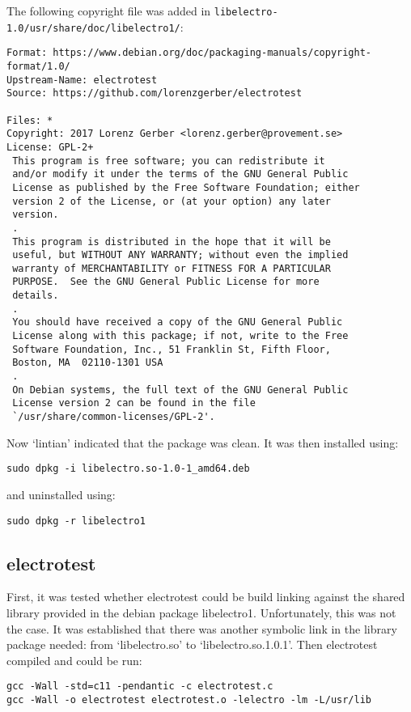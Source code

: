 \documentclass[a4paper,11pt,twoside]{article}
\begin{document}
The following copyright file was added in
\verb+libelectro-1.0/usr/share/doc/libelectro1/+:
\begin{verbatim}
Format: https://www.debian.org/doc/packaging-manuals/copyright-format/1.0/
Upstream-Name: electrotest
Source: https://github.com/lorenzgerber/electrotest

Files: *
Copyright: 2017 Lorenz Gerber <lorenz.gerber@provement.se>
License: GPL-2+
 This program is free software; you can redistribute it
 and/or modify it under the terms of the GNU General Public
 License as published by the Free Software Foundation; either
 version 2 of the License, or (at your option) any later
 version.
 .
 This program is distributed in the hope that it will be
 useful, but WITHOUT ANY WARRANTY; without even the implied
 warranty of MERCHANTABILITY or FITNESS FOR A PARTICULAR
 PURPOSE.  See the GNU General Public License for more
 details.
 .
 You should have received a copy of the GNU General Public
 License along with this package; if not, write to the Free
 Software Foundation, Inc., 51 Franklin St, Fifth Floor,
 Boston, MA  02110-1301 USA
 .
 On Debian systems, the full text of the GNU General Public
 License version 2 can be found in the file
 `/usr/share/common-licenses/GPL-2'.
\end{verbatim}

Now `lintian' indicated that the package was clean. It was then installed using:

\begin{verbatim}
sudo dpkg -i libelectro.so-1.0-1_amd64.deb
\end{verbatim}
and uninstalled using:
\begin{verbatim}
sudo dpkg -r libelectro1
\end{verbatim}

\subsection{electrotest}
First, it was tested whether electrotest could be build linking against the
shared library provided in the debian package libelectro1. Unfortunately, this
was not the case. It was established that there was another symbolic link in
the library package needed: from `libelectro.so' to `libelectro.so.1.0.1'.
Then electrotest compiled and could be run:
\begin{verbatim}
gcc -Wall -std=c11 -pendantic -c electrotest.c
gcc -Wall -o electrotest electrotest.o -lelectro -lm -L/usr/lib
\end{verbatim}
\end{document}
